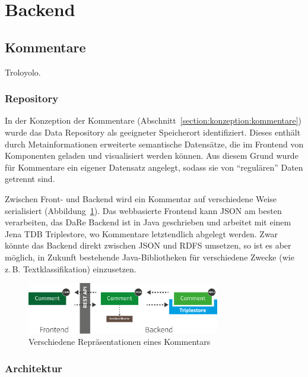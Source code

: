 \documentclass[
	headsepline,
	footsepline,
	fontsize=12pt,
	bibliography=totoc
]{scrbook}
\begin{document}
\section{Backend}
\label{section:implementierung:backend}

\subsection{Kommentare}
\label{section:implementierung:backend:kommentare}
Troloyolo.

\subsubsection{Repository}

In der Konzeption der Kommentare (Abschnitt~\ref{section:konzeption:kommentare}) wurde das Data Repository als geeigneter Speicherort identifiziert. Dieses enthält durch Metainformationen erweiterte semantische Datensätze, die im Frontend von Komponenten geladen und visualisiert werden können. Aus diesem Grund wurde für Kommentare ein eigener Datensatz angelegt, sodass sie von \enquote{regulären} Daten getrennt sind.

Zwischen Front- und Backend wird ein Kommentar auf verschiedene Weise serialisiert (Abbildung~\ref{figure:kommentare-backend}). Das webbasierte Frontend kann JSON am besten verarbeiten, das DaRe Backend ist in Java geschrieben und arbeitet mit einem Jena TDB Triplestore, wo Kommentare letztendlich abgelegt werden. Zwar könnte das Backend direkt zwischen JSON und RDFS umsetzen, so ist es aber möglich, in Zukunft bestehende Java-Bibliotheken für verschiedene Zwecke (wie z.\,B. Textklassifikation) einzusetzen.

\begin{figure}[htbp]
   \centering
   \includegraphics[width=0.75\textwidth]{images/implementierung-kommentare-backend.png}
   \caption{Verschiedene Repräsentationen eines Kommentars}
   \label{figure:kommentare-backend}
\end{figure}

\subsubsection{Architektur}
\end{document}
